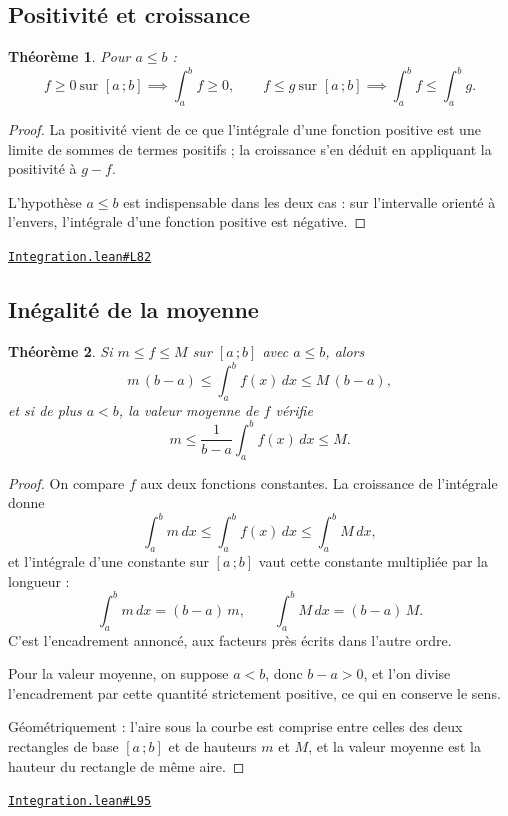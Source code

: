 \documentclass[11pt,a4paper]{article}
\theoremstyle{definition}
\theoremstyle{plain}
\newtheorem{theoreme}{Théorème}
\newcommand{\source}[2]{\par\smallskip\noindent\hfill{\footnotesize\href{#1}{\texttt{#2}}}\par\smallskip}
\begin{document}
\subsection{Positivité et croissance}

\begin{theoreme}
Pour $a \le b$ :
\[ f \ge 0 \ \text{sur } [a\,;b] \implies \int_a^b f \ge 0 , \qquad
   f \le g \ \text{sur } [a\,;b] \implies \int_a^b f \le \int_a^b g . \]
\end{theoreme}

\begin{proof}
La positivité vient de ce que l'intégrale d'une fonction positive est une limite de sommes de termes positifs ; la croissance s'en déduit
en appliquant la positivité à $g - f$.

\medskip\noindent
L'hypothèse $a \le b$ est indispensable dans les deux cas : sur l'intervalle orienté à
l'envers, l'intégrale d'une fonction positive est négative.
\end{proof}
\source{https://github.com/Commutator-IO/learn-lean/blob/main/courses/02-lycee/06-integration/Integration.lean\#L82}{Integration.lean\#L82}

\subsection{Inégalité de la moyenne}

\begin{theoreme}
Si $m \le f \le M$ sur $[a\,;b]$ avec $a \le b$, alors
\[ m\,(b - a) \le \int_a^b f(x)\,dx \le M\,(b - a) , \]
et si de plus $a < b$, la valeur moyenne de $f$ vérifie
\[ m \le \frac{1}{b - a}\int_a^b f(x)\,dx \le M . \]
\end{theoreme}

\begin{proof}
On compare $f$ aux deux fonctions constantes. La croissance de l'intégrale donne
\[ \int_a^b m\,dx \le \int_a^b f(x)\,dx \le \int_a^b M\,dx , \]
et l'intégrale d'une constante sur $[a\,;b]$ vaut cette constante multipliée par la
longueur :
\[ \int_a^b m\,dx = (b - a)\,m , \qquad \int_a^b M\,dx = (b - a)\,M . \]
C'est l'encadrement annoncé, aux facteurs près écrits dans l'autre ordre.

Pour la valeur moyenne, on suppose $a < b$, donc $b - a > 0$, et l'on divise l'encadrement
par cette quantité strictement positive, ce qui en conserve le sens.

\medskip\noindent
Géométriquement : l'aire sous la courbe est comprise entre celles des deux rectangles de
base $[a\,;b]$ et de hauteurs $m$ et $M$, et la valeur moyenne est la hauteur du rectangle
de même aire.
\end{proof}
\source{https://github.com/Commutator-IO/learn-lean/blob/main/courses/02-lycee/06-integration/Integration.lean\#L95}{Integration.lean\#L95}
\end{document}
